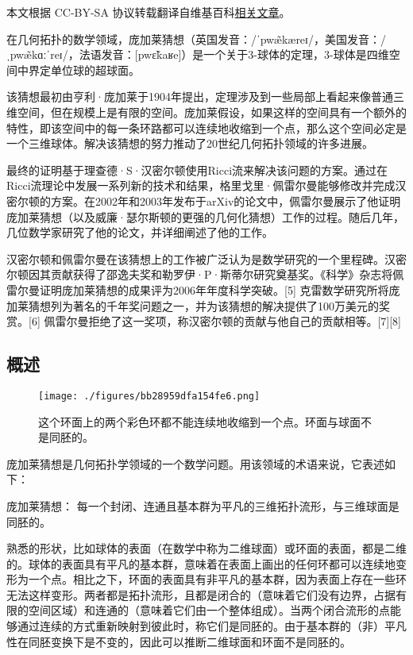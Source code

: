 
本文根据 CC-BY-SA 协议转载翻译自维基百科\href{https://en.wikipedia.org/wiki/Poincar\%C3\%A9_conjecture}{相关文章}。

在几何拓扑的数学领域，庞加莱猜想（英国发音：/ˈpwæ̃kæreɪ/，美国发音：/ˌpwæ̃kɑːˈreɪ/，法语发音：[pwɛ̃kaʁe]）是一个关于3-球体的定理，3-球体是四维空间中界定单位球的超球面。

该猜想最初由亨利·庞加莱于1904年提出，定理涉及到一些局部上看起来像普通三维空间，但在规模上是有限的空间。庞加莱假设，如果这样的空间具有一个额外的特性，即该空间中的每一条环路都可以连续地收缩到一个点，那么这个空间必定是一个三维球体。解决该猜想的努力推动了20世纪几何拓扑领域的许多进展。

最终的证明基于理查德·S·汉密尔顿使用Ricci流来解决该问题的方案。通过在Ricci流理论中发展一系列新的技术和结果，格里戈里·佩雷尔曼能够修改并完成汉密尔顿的方案。在2002年和2003年发布于arXiv的论文中，佩雷尔曼展示了他证明庞加莱猜想（以及威廉·瑟尔斯顿的更强的几何化猜想）工作的过程。随后几年，几位数学家研究了他的论文，并详细阐述了他的工作。

汉密尔顿和佩雷尔曼在该猜想上的工作被广泛认为是数学研究的一个里程碑。汉密尔顿因其贡献获得了邵逸夫奖和勒罗伊·P·斯蒂尔研究奠基奖。《科学》杂志将佩雷尔曼证明庞加莱猜想的成果评为2006年年度科学突破。[5] 克雷数学研究所将庞加莱猜想列为著名的千年奖问题之一，并为该猜想的解决提供了100万美元的奖赏。[6] 佩雷尔曼拒绝了这一奖项，称汉密尔顿的贡献与他自己的贡献相等。[7][8]
\subsection{概述}
\begin{figure}[ht]
\centering
\texttt{[image: ./figures/bb28959dfa154fe6.png]}
\caption{这个环面上的两个彩色环都不能连续地收缩到一个点。环面与球面不是同胚的。} \label{fig_PJLCX_1}
\end{figure}
庞加莱猜想是几何拓扑学领域的一个数学问题。用该领域的术语来说，它表述如下：

庞加莱猜想：  
每一个封闭、连通且基本群为平凡的三维拓扑流形，与三维球面是同胚的。

熟悉的形状，比如球体的表面（在数学中称为二维球面）或环面的表面，都是二维的。球体的表面具有平凡的基本群，意味着在表面上画出的任何环都可以连续地变形为一个点。相比之下，环面的表面具有非平凡的基本群，因为表面上存在一些环无法这样变形。两者都是拓扑流形，且都是闭合的（意味着它们没有边界，占据有限的空间区域）和连通的（意味着它们由一个整体组成）。当两个闭合流形的点能够通过连续的方式重新映射到彼此时，称它们是同胚的。由于基本群的（非）平凡性在同胚变换下是不变的，因此可以推断二维球面和环面不是同胚的。

